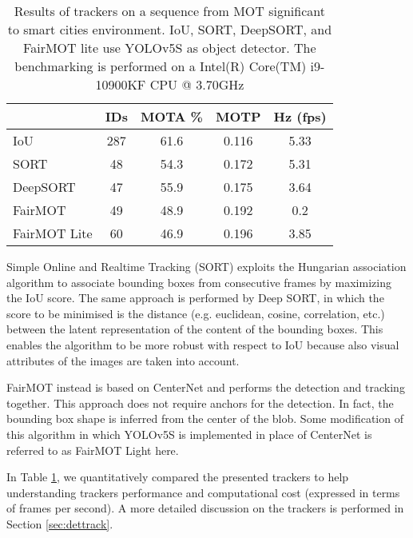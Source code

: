 \begin{table}[ht]
\begin{tabular}{lcccc}
\hline
\multicolumn{1}{c}{} & IDs & MOTA \% & MOTP  & Hz (fps) \\ \hline
IoU                  & 287 & 61.6    & 0.116 & 5.33     \\ \hline
SORT                 & 48  & 54.3    & 0.172 & 5.31     \\ \hline
DeepSORT             & 47  & 55.9    & 0.175 & 3.64     \\ \hline
FairMOT              & 49  & 48.9    & 0.192 & 0.2      \\ \hline
FairMOT Lite         & 60  & 46.9    & 0.196 & 3.85     \\ \hline
\end{tabular}
\caption{Results of trackers on a sequence from MOT significant to smart cities environment. IoU, SORT, DeepSORT, and FairMOT lite use YOLOv5S as object detector.
The benchmarking is performed on a Intel(R) Core(TM) i9-10900KF CPU @ 3.70GHz}
\label{table:trackers}
\end{table}

Simple Online and Realtime Tracking (SORT) exploits the Hungarian association algorithm to associate bounding boxes from consecutive frames by maximizing the IoU score. The same approach is performed by Deep SORT, in which the score to be minimised is the distance (e.g. euclidean, cosine, correlation, etc.) between the latent representation of the content of the bounding boxes. This enables the algorithm to be more robust with respect to IoU because also visual attributes of the images are taken into account.

FairMOT instead is based on CenterNet \cite{duan2019centernet} and performs the detection and tracking together. This approach does not require anchors for the detection. In fact, the bounding box shape is inferred from the center of the blob. Some modification of this algorithm in which YOLOv5S is implemented in place of CenterNet is referred to as FairMOT Light here.

In Table \ref{table:trackers}, we quantitatively compared the presented trackers to help understanding trackers performance and computational cost (expressed in terms of frames per second). A more detailed discussion on the trackers is performed in Section \ref{sec:dettrack}.


